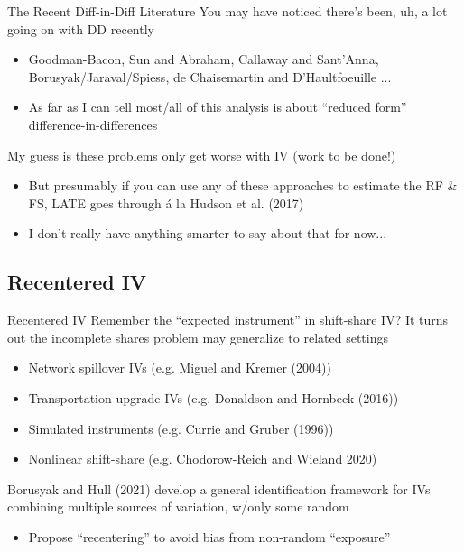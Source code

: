 \documentclass{beamer}
\begin{document}
\begin{frame}{The Recent Diff-in-Diff Literature}
You may have noticed there's been, uh, a lot going on with DD recently\smallskip
\begin{itemize}
\item Goodman-Bacon, Sun and Abraham, Callaway and Sant'Anna, Borusyak/Jaraval/Spiess, de Chaisemartin and D'Haultfoeuille ...\smallskip
\item As far as I can tell most/all of this analysis is about ``reduced form'' difference-in-differences
\end{itemize}\medskip\pause{}
My guess is these problems only get worse with IV (work to be done!)\smallskip
\begin{itemize}
\item But presumably if you can use any of these approaches to estimate the RF \& FS, LATE goes through \'{a} la Hudson et al. (2017)\smallskip
\item I don't really have anything smarter to say about that for now...
\end{itemize}
\end{frame}

\subsection{Recentered IV}
\begin{frame}{Recentered IV}
Remember the ``expected instrument'' in shift-share IV? It turns out the incomplete shares problem may generalize to related settings\smallskip
\begin{itemize}
\item Network spillover IVs (e.g. Miguel and Kremer (2004))\smallskip
\item Transportation upgrade IVs (e.g. Donaldson and Hornbeck (2016))\smallskip
\item Simulated instruments (e.g. Currie and Gruber (1996))\smallskip
\item Nonlinear shift-share (e.g. Chodorow-Reich and Wieland 2020)
\end{itemize}\bigskip\pause{}

Borusyak and Hull (2021) develop a general identification framework for IVs combining multiple sources of variation, w/only some random\smallskip
\begin{itemize}
\item Propose ``recentering'' to avoid bias from non-random ``exposure''
\end{itemize}
\end{frame}
\end{document}

